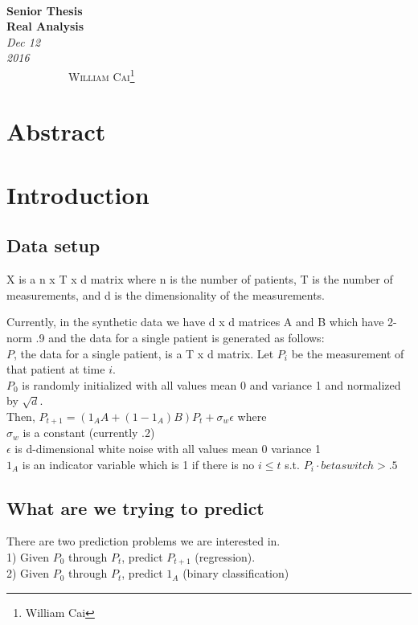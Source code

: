 \documentclass[12pt]{article}
\renewcommand{\=}[1]{\stackrel{#1}{=}} %
\theoremstyle{definition}
\begin{document}
{\noindent\Huge\bf  \\[0.5\baselineskip] {\selectfont  Senior Thesis}         }\\[2\baselineskip] %
{ {\bf {}\selectfont Real Analysis}\\ {\textit{\selectfont     Dec 12 2016}}}~~~~~~~~~~~~~~~~~~~~~~~~~~~~~~~~~~~~~~~~~~~~~~~~~~~~~~~~~~~~~~~~~~~~~~~~~~~~~\
{\large \textsc{William Cai}\footnote{William Cai}} %
\\[1.4\baselineskip] 
\section{Abstract}

\section{Introduction}
\subsection{Data setup}
X is a n x T x d matrix where n is the number of patients, T is the number of measurements, and d is the dimensionality of the measurements.  

Currently, in the synthetic data we have d x d matrices A and B which have 2-norm .9 and the data for a single patient is generated as follows:\\
$P$, the data for a single patient, is a T x d matrix.  Let $P_i$ be the measurement of that patient at time $i$.  \\
$P_0$ is randomly initialized with all values mean 0 and variance 1 and normalized by $\sqrt{d}$. \\
Then, $P_{t+1} = (1_AA+(1-1_A)B)P_{t} + \sigma_w \epsilon$ where \\
$\sigma_w$ is a constant (currently .2) \\
$\epsilon$ is d-dimensional white noise with all values mean 0 variance 1\\
$1_A$ is an indicator variable which is 1 if there is no $i \leq t$ s.t. $P_i \cdot betaswitch > .5$
\subsection{What are we trying to predict}
There are two prediction problems we are interested in. \\
1) Given $P_0$ through $P_t$, predict $P_{t+1}$ (regression). \\
2) Given $P_0$ through $P_t$, predict $1_A$ (binary classification) \\
\end{document}
